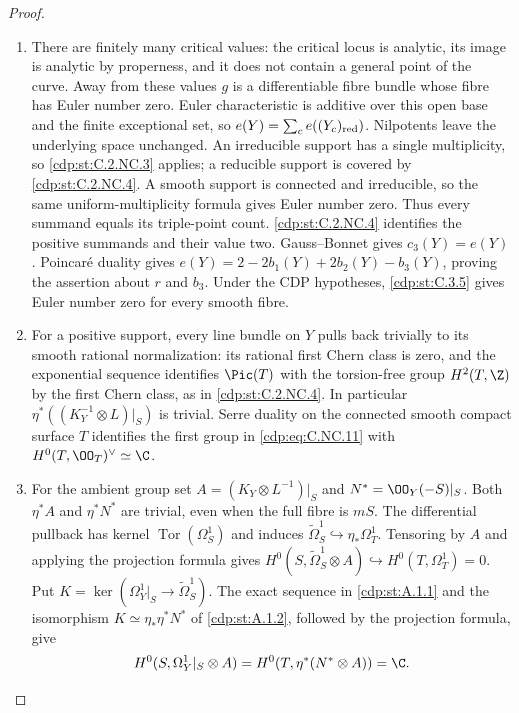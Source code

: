 \begin{proof}

\begin{enumerate}[label=\arabic*.,leftmargin=*]
\item There are finitely many critical values: the critical locus is analytic, its image is analytic by properness, and it does not contain a general point of the curve. Away from these values $g$ is a differentiable fibre bundle whose fibre has Euler number zero. Euler characteristic is additive over this open base and the finite exceptional set, so $e(Y)=\sum_c e((Y_c)_{\rm red})$. Nilpotents leave the underlying space unchanged. An irreducible support has a single multiplicity, so \ref{cdp:st:C.2.NC.3} applies; a reducible support is covered by \ref{cdp:st:C.2.NC.4}. A smooth support is connected and irreducible, so the same uniform-multiplicity formula gives Euler number zero. Thus every summand equals its triple-point count. \ref{cdp:st:C.2.NC.4} identifies the positive summands and their value two. Gauss--Bonnet gives $c_3(Y)=e(Y)$. Poincaré duality gives $e(Y)=2-2b_1(Y)+2b_2(Y)-b_3(Y)$, proving the assertion about $r$ and $b_3$. Under the CDP hypotheses, \ref{cdp:st:C.3.5} gives Euler number zero for every smooth fibre.

\item For a positive support, every line bundle on $Y$ pulls back trivially to its smooth rational normalization: its rational first Chern class is zero, and the exponential sequence identifies $\Pic(T)$ with the torsion-free group $H^2(T,\Z)$ by the first Chern class, as in \ref{cdp:st:C.2.NC.4}. In particular $\eta^*((K_Y^{-1}\otimes L)|_S)$ is trivial. Serre duality on the connected smooth compact surface $T$ identifies the first group in \eqref{cdp:eq:C.NC.11} with $H^0(T,\OO_T)^\vee\simeq\C$.

\item For the ambient group set $A=(K_Y\otimes L^{-1})|_S$ and $N^*=\OO_Y(-S)|_S$. Both $\eta^*A$ and $\eta^*N^*$ are trivial, even when the full fibre is $mS$. The differential pullback has kernel $\operatorname{Tor}(\Omega_S^1)$ and induces $\widetilde\Omega_S^1\hookrightarrow\eta_*\Omega_T^1$. Tensoring by $A$ and applying the projection formula gives
$H^0(S,\widetilde\Omega_S^1\otimes A)\hookrightarrow H^0(T,\Omega_T^1)=0$.
Put $K=\ker(\Omega_Y^1|_S\to\widetilde\Omega_S^1)$. The exact sequence in \ref{cdp:st:A.1.1} and the isomorphism $K\simeq\eta_*\eta^*N^*$ of \ref{cdp:st:A.1.2}, followed by the projection formula, give
\[
 H^0(S,\Omega_Y^1|_S\otimes A)
 =H^0(T,\eta^*(N^*\otimes A))=\C.
\]


\end{enumerate}
\end{proof}
